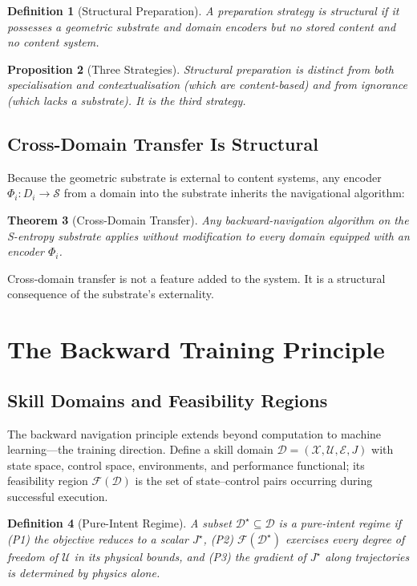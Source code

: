 \documentclass[twocolumn,11pt,a4paper]{article}
\newtheorem{theorem}{Theorem}[section]
\newtheorem{proposition}[theorem]{Proposition}
\newtheorem{definition}[theorem]{Definition}
\begin{document}
\begin{definition}[Structural Preparation]
A preparation strategy is \emph{structural} if it possesses a geometric substrate and domain encoders but no stored content and no content system.
\end{definition}

\begin{proposition}[Three Strategies]
Structural preparation is distinct from both specialisation and contextualisation (which are content-based) and from ignorance (which lacks a substrate). It is the third strategy.
\end{proposition}

\subsection{Cross-Domain Transfer Is Structural}

Because the geometric substrate is external to content systems, any encoder $\Phi_i : D_i \to \mathcal{S}$ from a domain into the substrate inherits the navigational algorithm:

\begin{theorem}[Cross-Domain Transfer]
Any backward-navigation algorithm on the S-entropy substrate applies without modification to every domain equipped with an encoder $\Phi_i$.
\end{theorem}

Cross-domain transfer is not a feature added to the system. It is a structural consequence of the substrate's externality.


\section{The Backward Training Principle}
\label{sec:backward_training}

\subsection{Skill Domains and Feasibility Regions}

The backward navigation principle extends beyond computation to machine learning---the training direction. Define a skill domain $\mathcal{D} = (\mathcal{X}, \mathcal{U}, \mathcal{E}, J)$ with state space, control space, environments, and performance functional; its feasibility region $\mathcal{F}(\mathcal{D})$ is the set of state--control pairs occurring during successful execution.

\begin{definition}[Pure-Intent Regime]
A subset $\mathcal{D}^\star \subseteq \mathcal{D}$ is a \emph{pure-intent regime} if (P1) the objective reduces to a scalar $J^\star$, (P2) $\mathcal{F}(\mathcal{D}^\star)$ exercises every degree of freedom of $\mathcal{U}$ in its physical bounds, and (P3) the gradient of $J^\star$ along trajectories is determined by physics alone.
\end{definition}
\end{document}
